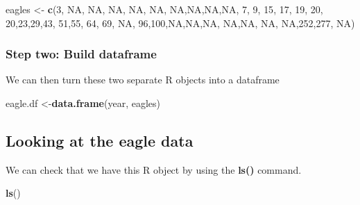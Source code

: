 \documentclass[]{book}
\newenvironment{Shaded}{\begin{snugshade}}{\end{snugshade}}
\newcommand{\KeywordTok}[1]{\textcolor[rgb]{0.13,0.29,0.53}{\textbf{#1}}}
\newcommand{\DecValTok}[1]{\textcolor[rgb]{0.00,0.00,0.81}{#1}}
\newcommand{\StringTok}[1]{\textcolor[rgb]{0.31,0.60,0.02}{#1}}
\newcommand{\OtherTok}[1]{\textcolor[rgb]{0.56,0.35,0.01}{#1}}
\newcommand{\NormalTok}[1]{#1}
\theoremstyle{definition}
\theoremstyle{definition}
\theoremstyle{definition}
\theoremstyle{remark}
\begin{document}
\begin{Shaded}
\begin{Highlighting}[]
\NormalTok{eagles <-}\StringTok{  }\KeywordTok{c}\NormalTok{(}\DecValTok{3}\NormalTok{, }\OtherTok{NA}\NormalTok{, }\OtherTok{NA}\NormalTok{, }\OtherTok{NA}\NormalTok{, }\OtherTok{NA}\NormalTok{, }\OtherTok{NA}\NormalTok{, }\OtherTok{NA}\NormalTok{,}\OtherTok{NA}\NormalTok{,}\OtherTok{NA}\NormalTok{,}\OtherTok{NA}\NormalTok{,}
             \DecValTok{7}\NormalTok{,  }\DecValTok{9}\NormalTok{, }\DecValTok{15}\NormalTok{, }\DecValTok{17}\NormalTok{, }\DecValTok{19}\NormalTok{, }\DecValTok{20}\NormalTok{, }\DecValTok{20}\NormalTok{,}\DecValTok{23}\NormalTok{,}\DecValTok{29}\NormalTok{,}\DecValTok{43}\NormalTok{,}
             \DecValTok{51}\NormalTok{,}\DecValTok{55}\NormalTok{, }\DecValTok{64}\NormalTok{, }\DecValTok{69}\NormalTok{, }\OtherTok{NA}\NormalTok{, }\DecValTok{96}\NormalTok{,}\DecValTok{100}\NormalTok{,}\OtherTok{NA}\NormalTok{,}\OtherTok{NA}\NormalTok{,}\OtherTok{NA}\NormalTok{,}
             \OtherTok{NA}\NormalTok{,}\OtherTok{NA}\NormalTok{, }\OtherTok{NA}\NormalTok{, }\OtherTok{NA}\NormalTok{,}\DecValTok{252}\NormalTok{,}\DecValTok{277}\NormalTok{, }\OtherTok{NA}\NormalTok{)}
\end{Highlighting}
\end{Shaded}

\subsubsection{Step two: Build
dataframe}\label{step-two-build-dataframe}

We can then turn these two separate R objects into a dataframe

\begin{Shaded}
\begin{Highlighting}[]
\NormalTok{eagle.df <-}\KeywordTok{data.frame}\NormalTok{(year, eagles)}
\end{Highlighting}
\end{Shaded}

\subsection{Looking at the eagle data}\label{looking-at-the-eagle-data}

We can check that we have this R object by using the \textbf{ls()}
command.

\begin{Shaded}
\begin{Highlighting}[]
\KeywordTok{ls}\NormalTok{()}
\end{Highlighting}
\end{Shaded}
\end{document}
